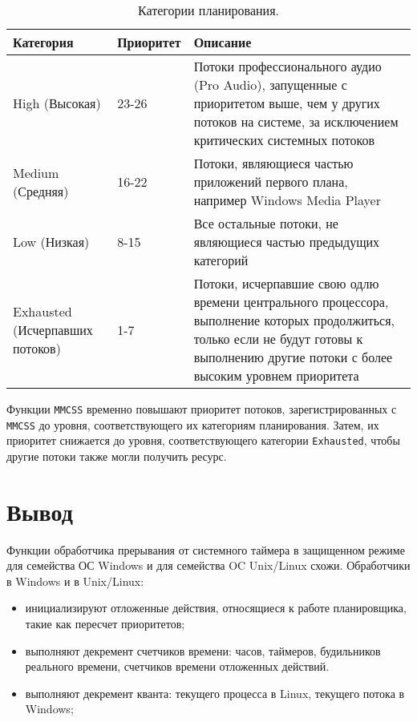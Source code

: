 \begin{table}[h]
    \caption{Категории планирования.}
    \begin{center}
        \begin{tabular}{|p{40mm}|p{30mm}|p{80mm}|}
            \hline
            \textbf{Категория} & \textbf{Приоритет} & \textbf{Описание} \\
            \hline
            High (Высокая) & 23-26 & Потоки профессионального аудио (Pro Audio), запущенные с приоритетом выше, чем у других потоков на системе, за исключением критических системных потоков \\
            \hline
            Medium (Средняя) & 16-22 & Потоки, являющиеся частью приложений первого плана, например Windows Media Player \\
            \hline
            Low (Низкая) & 8-15 & Все остальные потоки, не являющиеся частью предыдущих категорий \\
            \hline
            Exhausted (Исчерпавших потоков) & 1-7 & Потоки, исчерпавшие свою одлю времени центрального процессора, выполнение которых продолжиться, только если не будут готовы к выполнению другие потоки с более высоким уровнем приоритета \\
            \hline
        \end{tabular}
    \end{center}
    \label{tab:io}
\end{table}

Функции \texttt{MMCSS} временно повышают приоритет потоков, зарегистрированных с \texttt{MMCSS} до уровня, соответствующего их категориям планирования.  Затем, их приоритет снижается до уровня, соответствующего категории \texttt{Exhausted}, чтобы другие потоки также могли получить ресурс.

\chapter*{Вывод}

Функции обработчика прерывания от системного таймера в защищенном режиме для семейства ОС Windows и для семейства OC Unix/Linux схожи. Обработчики в Windows и в Unix/Linux:

\begin{itemize}
    \item инициализируют отложенные действия, относящиеся к работе планировщика, такие как пересчет приоритетов;
    \item выполняют декремент счетчиков времени: часов, таймеров, будильников реального времени, счетчиков времени отложенных действий.
    \item выполняют декремент кванта: текущего процесса в Linux, текущего потока в Windows;
\end{itemize}

